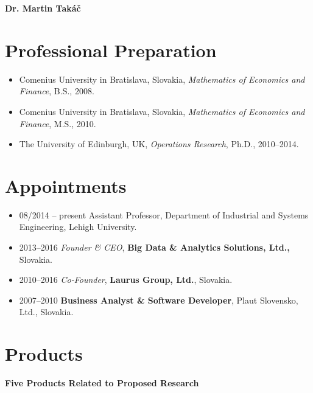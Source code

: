 \documentclass[11pt]{article}
\newcommand{\0}{ {\bf 0}}
\begin{document}
%
\begin{center}
{
\bf \large \color{color1}
 Dr. Martin Tak\'a\v{c} 
 }
%
%
 \end{center}
 
\begingroup
    \fontsize{11pt}{12pt}\selectfont
\section*{\color{color1}Professional Preparation\vskip-8pt}
\begin{itemize}
\setlength\itemsep{0em}

\item Comenius University in Bratislava,  Slovakia,
{\it Mathematics of Economics and Finance}, B.S., 2008.
\item Comenius University in Bratislava,  Slovakia,
{\it Mathematics of Economics and Finance}, M.S., 2010.
\item The University of Edinburgh, UK, {\it Operations Research}, Ph.D., 2010--2014.
\end{itemize}


\section*{\color{color1}Appointments\vskip-8pt}


\begin{itemize}
\item
08/2014 -- present
Assistant Professor,
Department of Industrial and Systems Engineering, Lehigh University.
 
 
\item 2013--2016 {\it Founder \& CEO}, {\bf Big Data \& Analytics Solutions, Ltd.,}  Slovakia.
 
\item 2010--2016 {\it Co-Founder}, {\bf Laurus Group, Ltd.}, Slovakia. 
 
\item 2007--2010 {\bf Business Analyst \& Software Developer}, Plaut Slovensko, Ltd., Slovakia. 
 
\end{itemize}


\section*{\color{color1}Products\vskip-8pt}


{\bf\color{color1}Five Products Related to Proposed Research\vskip-8pt}
\end{document}
